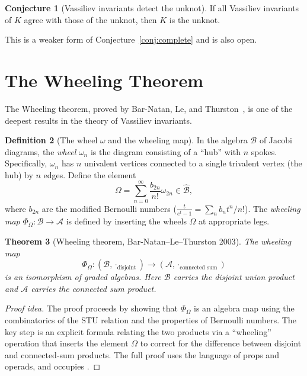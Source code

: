 \documentclass[12pt,a4paper]{amsart}
\newtheorem{theorem}{Theorem}[section]
\theoremstyle{definition}
\newtheorem{definition}[theorem]{Definition}
\newtheorem{conjecture}[theorem]{Conjecture}
\begin{document}
\begin{conjecture}[Vassiliev invariants detect the unknot]\label{conj:unknot}
If all Vassiliev invariants of $K$ agree with those of the unknot, then
$K$ is the unknot.
\end{conjecture}

This is a weaker form of Conjecture~\ref{conj:complete} and is also open.

\section{The Wheeling Theorem}\label{sec:barley}

The Wheeling theorem, proved by Bar-Natan, Le, and Thurston~\cite{barnatan2003},
is one of the deepest results in the theory of Vassiliev invariants.

\begin{definition}[The wheel $\omega$ and the wheeling map]
In the algebra $\mathcal{B}$ of Jacobi diagrams, the \emph{wheel} $\omega_n$
is the diagram consisting of a ``hub'' with $n$ spokes.  Specifically,
$\omega_n$ has $n$ univalent vertices connected to a single trivalent vertex
(the hub) by $n$ edges.  Define the element
\[
  \Omega = \sum_{n=0}^\infty \frac{b_{2n}}{n!} \omega_{2n}
  \in \hat{\mathcal{B}},
\]
where $b_{2n}$ are the modified Bernoulli numbers ($\frac{t}{e^t-1} = \sum_n b_n t^n/n!$).
The \emph{wheeling map} $\Phi_\Omega: \mathcal{B} \to \mathcal{A}$ is defined
by inserting the wheels $\Omega$ at appropriate legs.
\end{definition}

\begin{theorem}[Wheeling theorem, Bar-Natan--Le--Thurston 2003]\label{thm:wheeling}
The wheeling map
\[
  \Phi_\Omega: (\mathcal{B}, \cdot_{\text{disjoint}}) \to (\mathcal{A}, \cdot_{\text{connected sum}})
\]
is an isomorphism of graded algebras.  Here $\mathcal{B}$ carries the
disjoint union product and $\mathcal{A}$ carries the connected sum product.
\end{theorem}

\begin{proof}[Proof idea]
The proof proceeds by showing that $\Phi_\Omega$ is an algebra map using
the combinatorics of the STU relation and the properties of Bernoulli numbers.
The key step is an explicit formula relating the two products via a ``wheeling''
operation that inserts the element $\Omega$ to correct for the difference
between disjoint and connected-sum products.
The full proof uses the language of props and operads, and occupies
\cite{barnatan2003}.
\end{proof}
\end{document}
